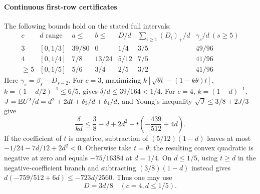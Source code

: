 \paragraph{Continuous first-row certificates}
The following bounds hold on the stated full intervals:
\begin{equation}\label{eq:outer-unit:low-packets}
\begin{array}{c|c|c|c|c|c|c}
 c&d\text{ range}&a\le&b\le&D/d&\sum_{i\ge1}(D_i)_+/d&
             \gamma_s/d\ (s\ge5)\\\hline
 3&[0,1/3]&39/80&0&1/4&3/5&49/96\\
 4&[0,1/4]&7/8&13/24&5/12&7/5&41/96\\
 \ge5&[0,1/5]&5/6&3/4&2/5&3/2&41/96
\end{array}
\end{equation}
Here \(\gamma_s=\beta_s-D_{s-2}\).
For \(c=3\), maximizing
\(k[\sqrt{\theta t}-(1-k\theta)t]\), \(k=(1-d/2)^{-1}\le6/5\),
gives \(\delta/d\le39/164<1/4\).
For \(c=4\), \(k=(1-d)^{-1}\),
\(J=\mathbb E U^2/d=d^2+2dt+\delta_3/d+\delta_4/d\), and Young's inequality
\(\sqrt J\le3/8+2J/3\) give
\begin{equation}\label{eq:outer-unit:four-error}
 \frac{\delta}{kd}\le\frac38-d+2d^2
                  +t\left(-\frac{439}{512}+4d\right).
\end{equation}
If the coefficient of \(t\) is negative, subtraction of
\((5/12)(1-d)\) leaves at most \(-1/24-7d/12+2d^2<0\).
Otherwise take \(t=\theta\); the resulting convex quadratic is
negative at zero and equals \(-75/16384\) at \(d=1/4\).
On \(d\le1/5\), using \(t\ge d\) in the negative-coefficient branch
and subtracting \((3/8)(1-d)\) instead gives
\(d(-759/512+6d)\le-723d/2560\). Thus one may use
\begin{equation}\label{eq:outer-unit:four-small-error}
 D=3d/8\quad(c=4, d\le1/5).
\end{equation}

